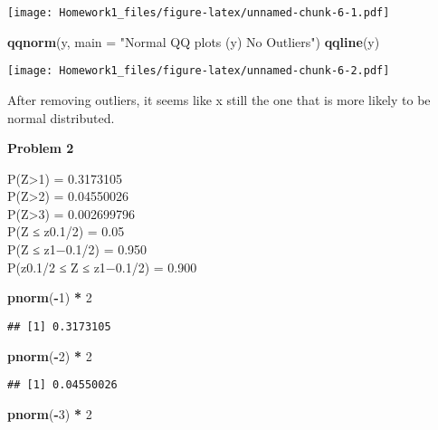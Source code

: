 \documentclass[
]{article}
\newenvironment{Shaded}{\begin{snugshade}}{\end{snugshade}}
\newcommand{\AttributeTok}[1]{\textcolor[rgb]{0.13,0.29,0.53}{#1}}
\newcommand{\DecValTok}[1]{\textcolor[rgb]{0.00,0.00,0.81}{#1}}
\newcommand{\FunctionTok}[1]{\textcolor[rgb]{0.13,0.29,0.53}{\textbf{#1}}}
\newcommand{\NormalTok}[1]{#1}
\newcommand{\SpecialCharTok}[1]{\textcolor[rgb]{0.81,0.36,0.00}{\textbf{#1}}}
\newcommand{\StringTok}[1]{\textcolor[rgb]{0.31,0.60,0.02}{#1}}
\begin{document}
\texttt{[image: Homework1\_files/figure-latex/unnamed-chunk-6-1.pdf]}

\begin{Shaded}
\begin{Highlighting}[]
\FunctionTok{qqnorm}\NormalTok{(y, }\AttributeTok{main =} \StringTok{"Normal QQ plots (y) No Outliers"}\NormalTok{)}
\FunctionTok{qqline}\NormalTok{(y)}
\end{Highlighting}
\end{Shaded}

\texttt{[image: Homework1\_files/figure-latex/unnamed-chunk-6-2.pdf]}

After removing outliers, it seems like x still the one that is more
likely to be normal distributed.

\textbf{Problem 2}

P(\textbar Z\textbar\textgreater1) = 0.3173105\\
P(\textbar Z\textbar\textgreater2) = 0.04550026\\
P(\textbar Z\textbar\textgreater3) = 0.002699796\\
P(Z ≤ z0.1/2) = 0.05\\
P(Z ≤ z1−0.1/2) = 0.950\\
P(z0.1/2 ≤ Z ≤ z1−0.1/2) = 0.900

\begin{Shaded}
\begin{Highlighting}[]
\FunctionTok{pnorm}\NormalTok{(}\SpecialCharTok{{-}}\DecValTok{1}\NormalTok{) }\SpecialCharTok{*} \DecValTok{2}
\end{Highlighting}
\end{Shaded}

\begin{verbatim}
## [1] 0.3173105
\end{verbatim}

\begin{Shaded}
\begin{Highlighting}[]
\FunctionTok{pnorm}\NormalTok{(}\SpecialCharTok{{-}}\DecValTok{2}\NormalTok{) }\SpecialCharTok{*} \DecValTok{2}
\end{Highlighting}
\end{Shaded}

\begin{verbatim}
## [1] 0.04550026
\end{verbatim}

\begin{Shaded}
\begin{Highlighting}[]
\FunctionTok{pnorm}\NormalTok{(}\SpecialCharTok{{-}}\DecValTok{3}\NormalTok{) }\SpecialCharTok{*} \DecValTok{2}
\end{Highlighting}
\end{Shaded}
\end{document}
